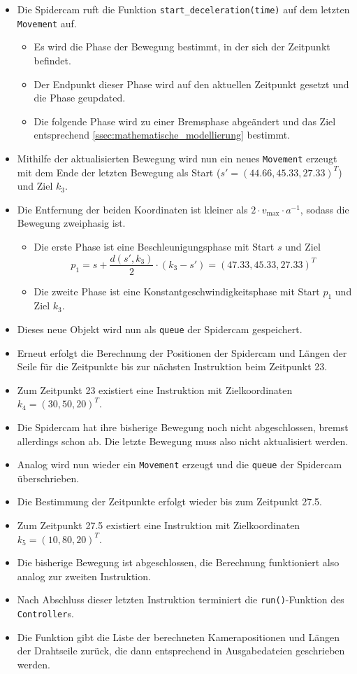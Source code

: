 \begin{itemize}
    \item Die Spidercam ruft die Funktion \texttt{start\_deceleration(time)} auf dem letzten \texttt{Movement} auf.
          \begin{itemize}
              \item Es wird die Phase der Bewegung bestimmt, in der sich der Zeitpunkt befindet.
              \item Der Endpunkt dieser Phase wird auf den aktuellen Zeitpunkt gesetzt und die Phase geupdated.
              \item Die folgende Phase wird zu einer Bremsphase abgeändert und das Ziel entsprechend \ref{ssec:mathematische_modellierung} bestimmt.
          \end{itemize}
    \item Mithilfe der aktualisierten Bewegung wird nun ein neues \texttt{Movement} erzeugt mit dem Ende der letzten Bewegung als Start ($s' = (44.66, 45.33, 27.33)^T$) und Ziel $k_3$.
    \item Die Entfernung der beiden Koordinaten ist kleiner als $2 \cdot v_{\max} \cdot a^{-1}$, sodass die Bewegung zweiphasig ist.
          \begin{itemize}
              \item Die erste Phase ist eine Beschleunigungsphase mit Start $s$ und Ziel
                    \[ p_1 = s + \frac{d(s', k_3)}{2} \cdot (k_3 - s') = (47.33, 45.33, 27.33)^T \]
              \item Die zweite Phase ist eine Konstantgeschwindigkeitsphase mit Start $p_1$ und Ziel $k_3$.
          \end{itemize}
    \item Dieses neue Objekt wird nun als \texttt{queue} der Spidercam gespeichert.
    \item Erneut erfolgt die Berechnung der Positionen der Spidercam und Längen der Seile für die Zeitpunkte bis zur nächsten Instruktion beim Zeitpunkt 23.
    \item Zum Zeitpunkt 23 existiert eine Instruktion mit Zielkoordinaten $k_4 = (30, 50, 20)^T$.
    \item Die Spidercam hat ihre bisherige Bewegung noch nicht abgeschlossen, bremst allerdings schon ab. Die letzte Bewegung muss also nicht aktualisiert werden.
    \item Analog wird nun wieder ein \texttt{Movement} erzeugt und die \texttt{queue} der Spidercam überschrieben.
    \item Die Bestimmung der Zeitpunkte erfolgt wieder bis zum Zeitpunkt 27.5.
    \item Zum Zeitpunkt 27.5 existiert eine Instruktion mit Zielkoordinaten $k_5 = (10, 80, 20)^T$.
    \item Die bisherige Bewegung ist abgeschlossen, die Berechnung funktioniert also analog zur zweiten Instruktion.
    \item Nach Abschluss dieser letzten Instruktion terminiert die \texttt{run()}-Funktion des \texttt{Controller}s.
    \item Die Funktion gibt die Liste der berechneten Kamerapositionen und Längen der Drahtseile zurück, die dann entsprechend in Ausgabedateien geschrieben werden.
\end{itemize}

